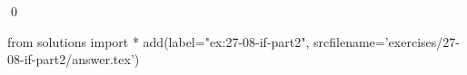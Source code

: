 
\begin{ex}
  \label{ex:27-08-if-part2}
  
  \qed
\end{ex}
\begin{python0}
from solutions import *
add(label="ex:27-08-if-part2",
    srcfilename='exercises/27-08-if-part2/answer.tex')
\end{python0}
